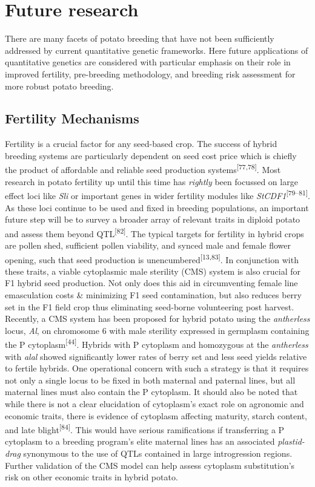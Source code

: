 \section{Future research}\label{sec-future}

There are many facets of potato breeding that have not been sufficiently
addressed by current quantitative genetic frameworks. Here future
applications of quantitative genetics are considered with particular
emphasis on their role in improved fertility, pre-breeding methodology,
and breeding risk assessment for more robust potato breeding.

\subsection{Fertility Mechanisms}\label{fertility-mechanisms}

Fertility is a crucial factor for any seed-based crop. The success of
hybrid breeding systems are particularly dependent on seed cost price
which is chiefly the product of affordable and reliable seed production
systems\textsuperscript{{[}77,78{]}}. Most research in potato fertility
up until this time has \emph{rightly} been focussed on large effect loci
like \emph{Sli} or important genes in wider fertility modules like
\emph{StCDF1}\textsuperscript{{[}79--81{]}}. As these loci continue to
be used and fixed in breeding populations, an important future step will
be to survey a broader array of relevant traits in diploid potato and
assess them beyond QTL\textsuperscript{{[}82{]}}. The typical targets
for fertility in hybrid crops are pollen shed, sufficient pollen
viability, and synced male and female flower opening, such that seed
production is unencumbered\textsuperscript{{[}13,83{]}}. In conjunction
with these traits, a viable cytoplasmic male sterility (CMS) system is
also crucial for F1 hybrid seed production. Not only does this aid in
circumventing female line emasculation costs \& minimizing F1 seed
contamination, but also reduces berry set in the F1 field crop thus
eliminating seed-borne volunteering post harvest. Recently, a CMS system
has been proposed for hybrid potato using the \emph{antherless} locus,
\emph{Al}, on chromosome 6 with male sterility expressed in germplasm
containing the P cytoplasm\textsuperscript{{[}44{]}}. Hybrids with P
cytoplasm and homozygous at the \emph{antherless} with \emph{alal}
showed significantly lower rates of berry set and less seed yields
relative to fertile hybrids. One operational concern with such a
strategy is that it requires not only a single locus to be fixed in both
maternal and paternal lines, but all maternal lines must also contain
the P cytoplasm. It should also be noted that while there is not a clear
elucidation of cytoplasm's exact role on agronomic and economic traits,
there is evidence of cytoplasm affecting maturity, starch content, and
late blight\textsuperscript{{[}84{]}}. This would have serious
ramifications if transferring a P cytoplasm to a breeding program's
elite maternal lines has an associated \emph{plastid-drag} synonymous to
the use of QTLs contained in large introgression regions. Further
validation of the CMS model can help assess cytoplasm substitution's
risk on other economic traits in hybrid potato.

